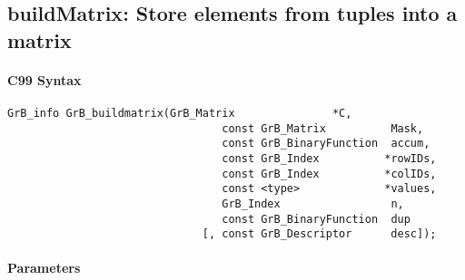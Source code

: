 \subsection{{\sf buildMatrix}: Store elements from tuples into a matrix}
\label{Sec:buildMatrix}


\paragraph{C99 Syntax}

\begin{Verbatim}[samepage=true]	
        GrB_info GrB_buildmatrix(GrB_Matrix               *C,
                                 const GrB_Matrix          Mask,
                                 const GrB_BinaryFunction  accum,
                                 const GrB_Index          *rowIDs,
                                 const GrB_Index          *colIDs, 
                                 const <type>             *values,
                                 GrB_Index                 n,
                                 const GrB_BinaryFunction  dup
                              [, const GrB_Descriptor      desc]);
\end{Verbatim}

\paragraph{Parameters}

